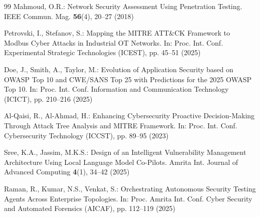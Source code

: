 \documentclass[runningheads]{llncs}
\begin{document}
\begin{thebibliography}{99}
Mahmoud, O.R.: Network Security Assessment Using Penetration Testing. IEEE Commun. Mag. \textbf{56}(4), 20--27 (2018)

Petrovski, I., Stefanov, S.: Mapping the MITRE ATT\&CK Framework to Modbus Cyber Attacks in Industrial OT Networks. In: Proc. Int. Conf. Experimental Strategic Technologies (ICEST), pp. 45--51 (2025)

Doe, J., Smith, A., Taylor, M.: Evolution of Application Security based on OWASP Top 10 and CWE/SANS Top 25 with Predictions for the 2025 OWASP Top 10. In: Proc. Int. Conf. Information and Communication Technology (ICICT), pp. 210--216 (2025)

Al-Qaisi, R., Al-Ahmad, H.: Enhancing Cybersecurity Proactive Decision-Making Through Attack Tree Analysis and MITRE Framework. In: Proc. Int. Conf. Cybersecurity Technology (ICCST), pp. 89--95 (2023)

Sree, K.A., Jassim, M.K.S.: Design of an Intelligent Vulnerability Management Architecture Using Local Language Model Co-Pilots. Amrita Int. Journal of Advanced Computing \textbf{4}(1), 34--42 (2025)

Raman, R., Kumar, N.S., Venkat, S.: Orchestrating Autonomous Security Testing Agents Across Enterprise Topologies. In: Proc. Amrita Int. Conf. Cyber Security and Automated Forensics (AICAF), pp. 112--119 (2025)

\end{thebibliography}
\end{document}
